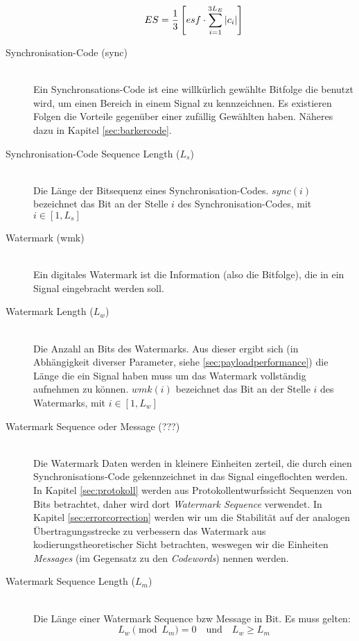 \begin{description}
	\begin{equation}
		ES = {1 \over 3} \left[ esf \cdot \sum\limits_{i=1}^{3{L}_{E}}|c_i| \right] \label{equ:embeddingstrength}
	\end{equation}
		
\item[Synchronisation-Code (sync)] \hfill \\ 
Ein Synchronsations-Code ist eine willk\"urlich gew\"ahlte Bitfolge die benutzt wird, um einen Bereich in einem Signal zu kennzeichnen. Es existieren Folgen die Vorteile gegen\"uber einer zuf\"allig Gew\"ahlten haben. N\"aheres dazu in Kapitel \ref{sec:barkercode}.

\item[Synchronisation-Code Sequence Length (${L}_{s}$)] \hfill \\
Die L\"ange der Bitsequenz eines Synchronisation-Codes. $sync(i)$ bezeichnet das Bit an der Stelle $i$ des Synchronisation-Codes, mit $i\in[1,{L}_{s}]$
	
\item[Watermark (wmk)] \hfill \\ 
Ein digitales Watermark ist die Information (also die Bitfolge), die in ein Signal eingebracht werden soll. 

\item[Watermark Length (${L}_{w}$)] \hfill \\
Die Anzahl an Bits des Watermarks. Aus dieser ergibt sich (in Abh\"angigkeit diverser Parameter, siehe \ref{sec:payloadperformance}) die L\"ange die ein Signal haben muss um das Watermark vollst\"andig aufnehmen zu k\"onnen. $wmk(i)$ bezeichnet das Bit an der Stelle $i$ des Watermarks, mit $i\in[1,{L}_{w}]$

\item[Watermark Sequence oder Message (???)] \hfill \\
Die Watermark Daten werden in kleinere Einheiten zerteil, die durch einen Synchronisations-Code gekennzeichnet in das Signal eingeflochten werden. In Kapitel \ref{sec:protokoll} werden aus Protokollentwurfssicht Sequenzen von Bits betrachtet, daher wird dort \textit{Watermark Sequence} verwendet. In Kapitel \ref{sec:errorcorrection} werden wir um die Stabilit\"at auf der analogen Übertragungsstrecke zu verbessern das Watermark aus kodierungstheoretischer Sicht betrachten, weswegen wir die Einheiten \textit{Messages} (im Gegensatz zu den \textit{Codewords}) nennen werden. 
	
\item[Watermark Sequence Length (${L}_{m}$)] \hfill \\
Die L\"ange einer Watermark Sequence bzw Message in Bit. Es muss gelten: 
	 \begin{equation}
		 {L}_{w} \pmod{{L}_{m}} = 0 \quad\mbox{und}\quad {L}_{w}\geq{L}_{m} \label{equ:wmkseqlength}
	 \end{equation}
	 

\end{description}
